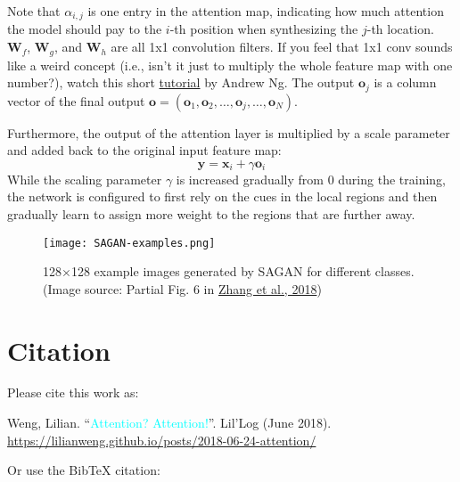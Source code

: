 \documentclass[12pt]{article}
\begin{document}
Note that $\alpha_{i,j}$ is one entry in the attention map, indicating how much attention the model should pay to the $i$-th position when synthesizing the $j$-th location. $\mathbf{W}_f$, $\mathbf{W}_g$, and $\mathbf{W}_h$ are all 1x1 convolution filters. If you feel that 1x1 conv sounds like a weird concept (i.e., isn’t it just to multiply the whole feature map with one number?), watch this short \href{https://www.coursera.org/lecture/convolutional-neural-networks/networks-in-networks-and-1x1-convolutions-ZTb8x}{tutorial} by Andrew Ng. The output $\mathbf{o}_j$ is a column vector of the final output $\mathbf{o}= (\mathbf{o}_1, \mathbf{o}_2, \dots, \mathbf{o}_j, \dots, \mathbf{o}_N)$.

Furthermore, the output of the attention layer is multiplied by a scale parameter and added back to the original input feature map:
\[
\mathbf{y} = \mathbf{x}_i + \gamma \mathbf{o}_i
\]
While the scaling parameter $\gamma$ is increased gradually from 0 during the training, the network is configured to first rely on the cues in the local regions and then gradually learn to assign more weight to the regions that are further away.

\begin{figure}[H]
    \centering
    \texttt{[image: SAGAN-examples.png]}
    \caption{128$\times$128 example images generated by SAGAN for different classes. (Image source: Partial Fig. 6 in \href{https://arxiv.org/pdf/1805.08318.pdf}{Zhang et al., 2018})}
\end{figure}





\section*{Citation}
Please cite this work as:

\begin{tcolorbox}[colback=black!5!white, colframe=black!80!white, boxrule=0.5pt, arc=2mm, left=1mm, right=1mm, top=1mm, bottom=1mm]
  Weng, Lilian. ``\textcolor{cyan}{Attention? Attention!}''. Lil'Log (June 2018). \href{https://lilianweng.github.io/posts/2018-06-24-attention/}{https://lilianweng.github.io/posts/2018-06-24-attention/}
\end{tcolorbox}

Or use the BibTeX citation:
\end{document}

